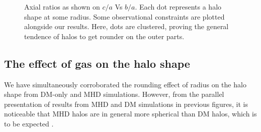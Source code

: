 \begin{figure}[!ht]
  \centering
  \hfill
  \hfill
  \caption{Axial ratios as shown on $c/a$ Vs $b/a$. Each dot represents a halo shape at some radius. Some observational constraints are plotted alongside our results. Here, dots are clustered, proving the general tendence of halos to get rounder on the outer parts. }
  \label{fig:Triaxiality_Inner_Outer}
\end{figure}


\subsection{The effect of gas on the halo shape}
We have simultaneously corroborated the rounding effect of radius on the halo shape from DM-only and MHD simulations. However, from the parallel presentation of results from MHD and DM simulations in previous figures, it is noticeable that MHD halos are in general more spherical than DM halos, which is to be expected \cite{Barnes_and_Hernquist_1996,Springel_et_al._2004,Bryan_et_al._2013}.\\

